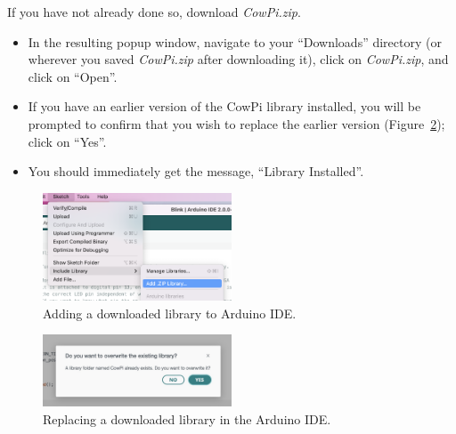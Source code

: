 If you have not already done so, download \textit{CowPi.zip}.

\begin{description}
        \begin{itemize}
            \item In the resulting popup window, navigate to your ``Downloads'' directory (or wherever you saved \textit{CowPi.zip} after downloading it), click on \textit{CowPi.zip}, and click on ``Open''.
            \item If you have an earlier version of the CowPi library installed, you will be prompted to confirm that you wish to replace the earlier version (Figure~\ref{fig:update-library});
                click on ``Yes''.
            \item You should immediately get the message, ``Library Installed''.
        \end{itemize}
\end{description}

\begin{figure}
    \centering
    \includegraphics[width=0.5\textwidth]{direct/library/add-zip-library}
    \caption{Adding a downloaded library to Arduino IDE. \label{fig:add-library}}
\end{figure}

\begin{figure}
    \centering
    \includegraphics[width=0.5\textwidth]{direct/library/update-zip-library}
    \caption{Replacing a downloaded library in the Arduino IDE. \label{fig:update-library}}
\end{figure}

